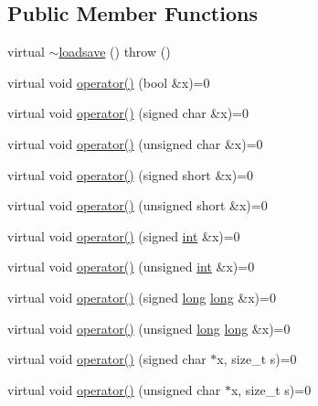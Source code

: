 \subsection*{Public Member Functions}
\begin{DoxyCompactItemize}
\item 
virtual \hyperlink{classgambatte_1_1loadsave_a96a8c63427797752e26a03b4a1c2c495}{$\sim$loadsave} ()  throw ()
\item 
virtual void \hyperlink{classgambatte_1_1loadsave_a286a1bc924db345dda227a735a5ba038}{operator()} (bool \&x)=0
\item 
virtual void \hyperlink{classgambatte_1_1loadsave_abe43ebb74162f066b542781f5ec7e5af}{operator()} (signed char \&x)=0
\item 
virtual void \hyperlink{classgambatte_1_1loadsave_a475286c3cdfc0a207cd6ac9d27bf5b0b}{operator()} (unsigned char \&x)=0
\item 
virtual void \hyperlink{classgambatte_1_1loadsave_a8874e92f76b3765efba593c377667f16}{operator()} (signed short \&x)=0
\item 
virtual void \hyperlink{classgambatte_1_1loadsave_a36c04339183e08d7dbfa0aeabc3c953d}{operator()} (unsigned short \&x)=0
\item 
virtual void \hyperlink{classgambatte_1_1loadsave_a9a8e8765ac066a4d51099147f71595d1}{operator()} (signed \hyperlink{ioapi_8h_a787fa3cf048117ba7123753c1e74fcd6}{int} \&x)=0
\item 
virtual void \hyperlink{classgambatte_1_1loadsave_a263bbb4b470594752ca94548673e66a4}{operator()} (unsigned \hyperlink{ioapi_8h_a787fa3cf048117ba7123753c1e74fcd6}{int} \&x)=0
\item 
virtual void \hyperlink{classgambatte_1_1loadsave_a882deed58830a077498c160ba2870eec}{operator()} (signed \hyperlink{ioapi_8h_a3c7b35ad9dab18b8310343c201f7b27e}{long} \hyperlink{ioapi_8h_a3c7b35ad9dab18b8310343c201f7b27e}{long} \&x)=0
\item 
virtual void \hyperlink{classgambatte_1_1loadsave_aca5dcc05e845b6aa3086065048ab6e29}{operator()} (unsigned \hyperlink{ioapi_8h_a3c7b35ad9dab18b8310343c201f7b27e}{long} \hyperlink{ioapi_8h_a3c7b35ad9dab18b8310343c201f7b27e}{long} \&x)=0
\item 
virtual void \hyperlink{classgambatte_1_1loadsave_a8ba29ce3f56dbaa7ac1d4aec4b705af3}{operator()} (signed char $\ast$x, size\+\_\+t s)=0
\item 
virtual void \hyperlink{classgambatte_1_1loadsave_ae1ab673c435463f83c510446d7455436}{operator()} (unsigned char $\ast$x, size\+\_\+t s)=0

\end{DoxyCompactItemize}
